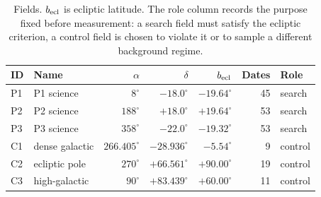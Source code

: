 \documentclass[11pt,a4paper]{article}
\begin{document}
\begin{table}[htbp]
\centering
\small
\caption{Fields. $b_{\rm ecl}$ is ecliptic latitude. The role column records the
purpose fixed before measurement: a search field must satisfy the ecliptic
criterion, a control field is chosen to violate it or to sample a different
background regime.}
\label{tab:fields}
\begin{tabular}{llrrrrl}
\toprule
ID & Name & $\alpha$ & $\delta$ & $b_{\rm ecl}$ & Dates & Role \\
\midrule
P1 & P1 science     & $8^{\circ}$   & $-18.0^{\circ}$ & $-19.64^{\circ}$ & 45 & search \\
P2 & P2 science     & $188^{\circ}$ & $+18.0^{\circ}$ & $+19.64^{\circ}$ & 53 & search \\
P3 & P3 science     & $358^{\circ}$ & $-22.0^{\circ}$ & $-19.32^{\circ}$ & 53 & search \\
C1 & dense galactic & $266.405^{\circ}$ & $-28.936^{\circ}$ & $-5.54^{\circ}$ & 9 & control \\
C2 & ecliptic pole  & $270^{\circ}$ & $+66.561^{\circ}$ & $+90.00^{\circ}$ & 19 & control \\
C3 & high-galactic  & $90^{\circ}$  & $+83.439^{\circ}$ & $+60.00^{\circ}$ & 11 & control \\
\bottomrule
\end{tabular}
\end{table}
\end{document}
